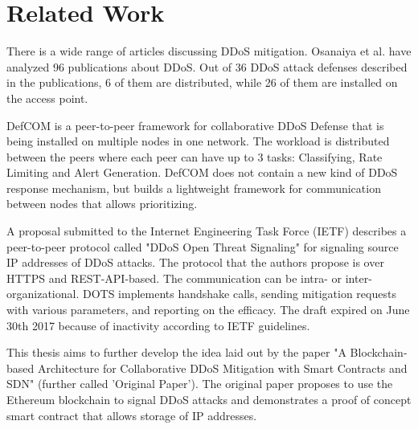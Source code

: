 \chapter{Related Work}

There is a wide range of articles discussing DDoS mitigation. Osanaiya et al. \cite{DDoSOverview} have analyzed 96 publications about DDoS. Out of 36 DDoS attack defenses described in the publications, 6 of them are distributed, while 26 of them are installed on the access point.

DefCOM \cite{DefCOM} is a peer-to-peer framework for collaborative DDoS Defense that is being installed on multiple nodes in one network. The workload is distributed between the peers where each peer can have up to 3 tasks: Classifying, Rate Limiting and Alert Generation. DefCOM does not contain a new kind of DDoS response mechanism, but builds a lightweight framework for communication between nodes that allows prioritizing.

A proposal submitted to the Internet Engineering Task Force (IETF) \cite{IETFDraft} describes a peer-to-peer protocol called "DDoS Open Threat Signaling" for signaling source IP addresses of DDoS attacks. The protocol that the authors propose is over HTTPS and REST-API-based. The communication can be intra- or  inter-organizational. DOTS implements handshake calls, sending mitigation requests with various parameters, and reporting on the efficacy. The draft expired on June 30th 2017 because of inactivity according to IETF guidelines.

This thesis aims to further develop the idea laid out by the paper "A Blockchain-based Architecture for Collaborative DDoS Mitigation with Smart Contracts and SDN" \cite{OriginalPaper} (further called 'Original Paper'). The original paper proposes to use the Ethereum blockchain to signal DDoS attacks and demonstrates a proof of concept smart contract that allows storage of IP addresses. 
